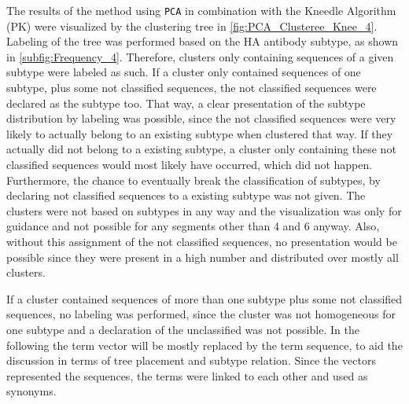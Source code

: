 \vspace{1em}

The results of the method using \texttt{PCA} in combination with the Kneedle Algorithm (PK) were visualized by the clustering tree in \autoref{fig:PCA_Clusteree_Knee_4}. Labeling of the tree was performed based on the \gls{HA} antibody subtype, as shown in \autoref{subfig:Frequency_4}. Therefore, clusters only containing sequences of a given subtype were labeled as such. If a cluster only contained sequences of one subtype, plus some not classified sequences, the not classified sequences were declared as the subtype too. That way, a clear presentation of the subtype distribution by labeling was possible, since the not classified sequences were very likely to actually belong to an existing subtype when clustered that way. If they actually did not belong to a existing subtype, a cluster only containing these not classified sequences would most likely have occurred, which did not happen. Furthermore, the chance to eventually break the classification of subtypes, by declaring not classified sequences to a existing subtype was not given. The clusters were not based on subtypes in any way and the visualization was only for guidance and not possible for any segments other than 4 and 6 anyway. Also, without this assignment of the not classified sequences, no presentation would be possible since they were present in a high number and distributed over mostly all clusters.

\vspace{1em}

If a cluster contained sequences of more than one subtype plus some not classified sequences, no labeling was performed, since the cluster was not homogeneous for one subtype and a declaration of the unclassified was not possible. In the following the term vector will be mostly replaced by the term sequence, to aid the discussion in terms of tree placement and subtype relation. Since the vectors represented the sequences, the terms were linked to each other and used as synonyms. %

